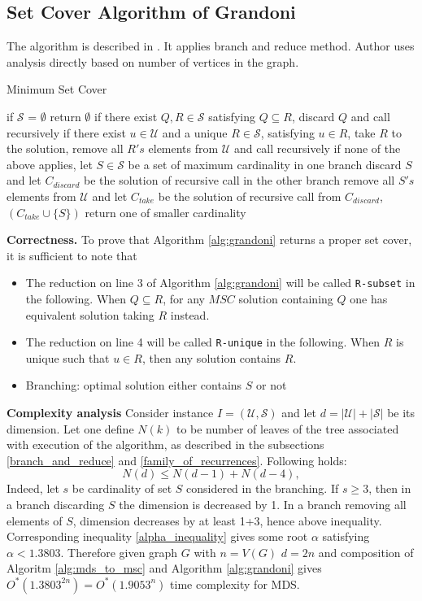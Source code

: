 \subsection{Set Cover Algorithm of Grandoni}
The algorithm is described in \cite{GRANDONI2006209}. It applies branch and reduce method. Author uses analysis directly based on number of vertices in the graph.

\begin{algorithm}[H]
\caption{Minimum Set Cover}
\label{alg:grandoni}
\begin{algorithmic}[1]
\State if $\mathcal{S}$ = $\emptyset$ return $\emptyset$ 
\State if there exist  $Q, R \in \mathcal{S}$ satisfying $Q \subseteq R$, discard $Q$ and call recursively
\State if there exist $u\in \mathcal{U}$ and a unique $R\in\mathcal{S}$, satisfying $u \in R$, take $R$ to the solution, remove all $R's$ elements from $\mathcal{U}$ and call recursively
\State if none of the above applies, let $S \in \mathcal{S}$ be a set of maximum cardinality
\State in one branch discard $S$ and let $C_{discard}$ be the solution of recursive call
\State in the other branch remove all $S's$ elements from $\mathcal{U}$ and let $C_{take}$ be the solution of recursive call
\State from $C_{discard}$, $(C_{take} \cup \{S\})$ return one of smaller cardinality
\EndProcedure
\end{algorithmic}
\end{algorithm}

\textbf{Correctness.} To prove that Algorithm \ref{alg:grandoni} returns a proper set cover, it is sufficient to note that
\begin{itemize}
    \item The reduction on line 3 of Algorithm \ref{alg:grandoni} will be called \texttt{R-subset} in the following. When $Q \subseteq R$, for any $MSC$ solution containing $Q$ one has equivalent solution taking $R$ instead.
    \item The reduction on line 4 will be called \texttt{R-unique} in the following. When $R$ is unique such that $u\in R$, then any solution contains $R$.
    \item Branching: optimal solution either contains $S$ or not
\end{itemize}
\textbf{Complexity analysis}
Consider instance $I = (\mathcal{U}, \mathcal{S})$ and let $d = |\mathcal{U}| + |\mathcal{S}|$ be its dimension. Let one define $N(k)$ to be number of leaves of the tree associated with execution of the algorithm, as described in the subsections \ref{branch_and_reduce} and \ref{family_of_recurrences}. Following holds:
$$
N(d) \leq N(d -1) + N(d - 4),
$$
Indeed, let $s$ be cardinality of set $S$ considered in the branching. If $s \geq 3$, then in a branch discarding $S$ the dimension is decreased by 1. In a branch removing all elements of $S$, dimension decreases by at least 1+3, hence above inequality. Corresponding inequality \eqref{alpha_inequality} gives some root $\alpha$ satisfying $\alpha < 1.3803$. Therefore given graph $G$ with $n = V(G)$ $d=2n$ and composition of Algoritm \ref{alg:mds_to_msc} and Algorithm \ref{alg:grandoni} gives $O^*(1.3803^{2n}) = O^*(1.9053^n)$ time complexity for MDS.

